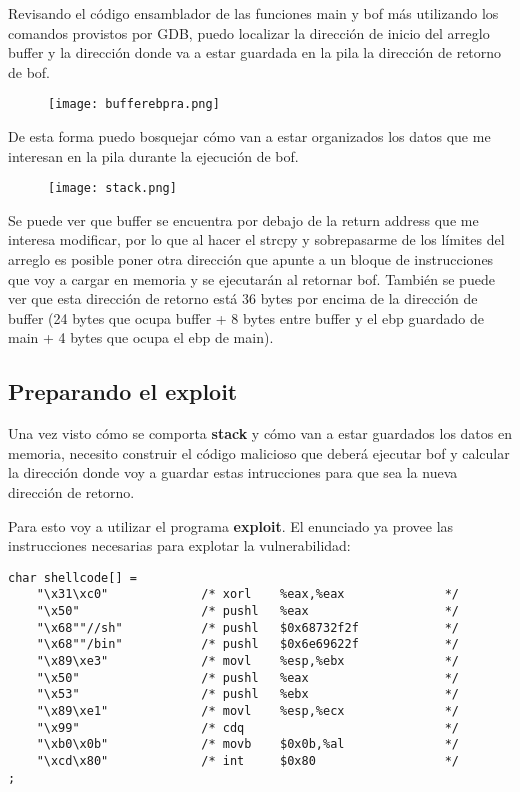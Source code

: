 \documentclass[11pt]{article}
\begin{document}
Revisando el código ensamblador de las funciones main y bof más utilizando los comandos
provistos por GDB, puedo localizar la dirección de inicio del arreglo buffer y 
la dirección donde va a estar guardada en la pila la dirección de retorno de bof.

\begin{figure}[h!]
    \begin{center}
        \texttt{[image: bufferebpra.png]}
    \end{center}
\end{figure}

De esta forma puedo bosquejar cómo van a estar organizados los datos que me
interesan en la pila durante la ejecución de bof.

\begin{figure}[h!]
    \begin{center}
        \texttt{[image: stack.png]}
    \end{center}
\end{figure}

Se puede ver que buffer se encuentra por debajo de la return address que me interesa
modificar, por lo que al hacer el strcpy y sobrepasarme de los límites del arreglo
es posible poner otra dirección que apunte a un bloque de instrucciones que voy
a cargar en memoria y se ejecutarán al retornar bof.
También se puede ver que esta dirección de retorno está 36 bytes por encima
de la dirección de buffer (24 bytes que ocupa buffer + 8 bytes entre buffer y
el ebp guardado de main + 4 bytes que ocupa el ebp de main).

\subsection*{Preparando el exploit}

Una vez visto cómo se comporta \textbf{stack} y cómo van a estar guardados los datos en memoria,
necesito construir el código malicioso que deberá ejecutar bof y calcular la dirección donde
voy a guardar estas intrucciones para que sea la nueva dirección de retorno.

Para esto voy a utilizar el programa \textbf{exploit}. El enunciado ya provee 
las instrucciones necesarias para explotar la vulnerabilidad:

\begin{verbatim}
char shellcode[] =
    "\x31\xc0"             /* xorl    %eax,%eax              */
    "\x50"                 /* pushl   %eax                   */
    "\x68""//sh"           /* pushl   $0x68732f2f            */
    "\x68""/bin"           /* pushl   $0x6e69622f            */
    "\x89\xe3"             /* movl    %esp,%ebx              */
    "\x50"                 /* pushl   %eax                   */
    "\x53"                 /* pushl   %ebx                   */
    "\x89\xe1"             /* movl    %esp,%ecx              */
    "\x99"                 /* cdq                            */
    "\xb0\x0b"             /* movb    $0x0b,%al              */
    "\xcd\x80"             /* int     $0x80                  */
;
\end{verbatim}
\end{document}
